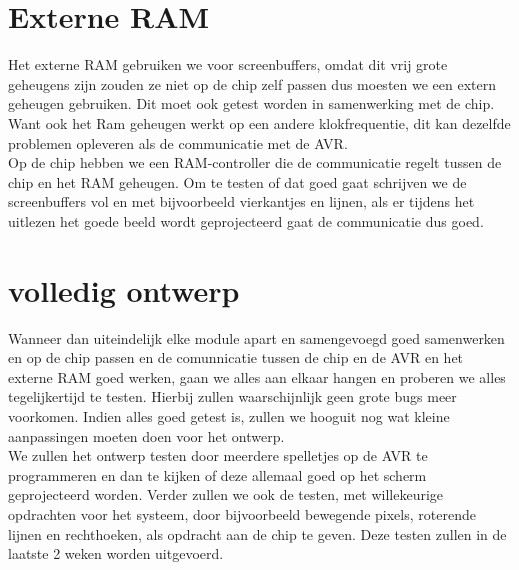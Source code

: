 \documentclass{scrartcl} %
\begin{document}
\section{Externe RAM}

Het externe RAM gebruiken we voor screenbuffers, omdat dit vrij grote geheugens zijn zouden ze niet op de chip zelf passen dus moesten we een extern geheugen gebruiken. Dit moet ook getest worden in samenwerking met de chip. Want ook het Ram geheugen werkt op een andere klokfrequentie, dit kan dezelfde problemen opleveren als de communicatie met de AVR.\\ Op de chip hebben we een RAM-controller die de communicatie regelt tussen de chip en het RAM geheugen. Om te testen of dat goed gaat schrijven we de screenbuffers vol en met bijvoorbeeld vierkantjes en lijnen, als er tijdens het uitlezen het goede beeld wordt geprojecteerd gaat de communicatie dus goed.


\section{volledig ontwerp}

Wanneer dan uiteindelijk elke module apart en samengevoegd goed samenwerken en op de chip passen en de comunnicatie tussen de chip en de AVR en het externe RAM goed werken, gaan we alles aan elkaar hangen en proberen we alles tegelijkertijd te testen. 
Hierbij zullen waarschijnlijk geen grote bugs meer voorkomen. Indien alles goed getest is, zullen we hooguit nog wat kleine aanpassingen moeten doen voor het ontwerp.\\ We zullen het ontwerp testen door meerdere spelletjes op de AVR te programmeren en dan te kijken of deze allemaal goed op het scherm geprojecteerd worden. Verder zullen we ook de testen, met willekeurige opdrachten voor het systeem, door bijvoorbeeld bewegende pixels, roterende lijnen en rechthoeken, als opdracht aan de chip te geven. Deze testen zullen in de laatste 2 weken worden uitgevoerd.
\end{document}
